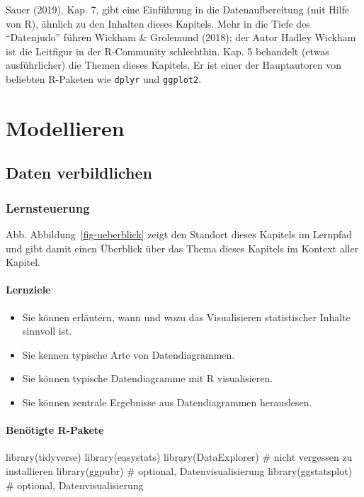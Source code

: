 \documentclass[
  letterpaper,
]{scrbook}
\newenvironment{Shaded}{\begin{snugshade}}{\end{snugshade}}
\newcommand{\CommentTok}[1]{\textcolor[rgb]{0.37,0.37,0.37}{#1}}
\newcommand{\FunctionTok}[1]{\textcolor[rgb]{0.28,0.35,0.67}{#1}}
\newcommand{\NormalTok}[1]{\textcolor[rgb]{0.00,0.23,0.31}{#1}}
\providecommand{\tightlist}{%
  \setlength{\itemsep}{0pt}\setlength{\parskip}{0pt}}\usepackage{longtable,booktabs,array}
\theoremstyle{definition}
\theoremstyle{definition}
\theoremstyle{definition}
\theoremstyle{remark}
\begin{document}
Sauer (2019), Kap. 7, gibt eine Einführung in die Datenaufbereitung (mit
Hilfe von R), ähnlich zu den Inhalten dieses Kapitels. Mehr in die Tiefe
des \enquote{Datenjudo} führen Wickham \& Grolemund (2018); der Autor
Hadley Wickham ist die Leitfigur in der R-Community schlechthin. Kap. 5
behandelt (etwas ausführlicher) die Themen dieses Kapitels. Er ist einer
der Hauptautoren von beliebten R-Paketen wie \texttt{dplyr} und
\texttt{ggplot2}.

\part{Modellieren}

\chapter{Daten verbildlichen}\label{daten-verbildlichen}

\section{Lernsteuerung}\label{lernsteuerung-3}

Abb. Abbildung~\ref{fig-ueberblick} zeigt den Standort dieses Kapitels
im Lernpfad und gibt damit einen Überblick über das Thema dieses
Kapitels im Kontext aller Kapitel.

\subsection{Lernziele}\label{lernziele-4}

\begin{itemize}
\tightlist
\item
  Sie können erläutern, wann und wozu das Visualisieren statistischer
  Inhalte sinnvoll ist.
\item
  Sie kennen typische Arte von Datendiagrammen.
\item
  Sie können typische Datendiagramme mit R visualisieren.
\item
  Sie können zentrale Ergebnisse aus Datendiagrammen herauslesen.
\end{itemize}

\subsection{Benötigte R-Pakete}\label{benuxf6tigte-r-pakete-1}

\begin{Shaded}
\begin{Highlighting}[]
\FunctionTok{library}\NormalTok{(tidyverse)}
\FunctionTok{library}\NormalTok{(easystats)}
\FunctionTok{library}\NormalTok{(DataExplorer)  }\CommentTok{\# nicht vergessen zu installieren}
\FunctionTok{library}\NormalTok{(ggpubr)  }\CommentTok{\# optional, Datenvisualisierung}
\FunctionTok{library}\NormalTok{(ggstatsplot)  }\CommentTok{\# optional, Datenvisualisierung}
\end{Highlighting}
\end{Shaded}
\end{document}
